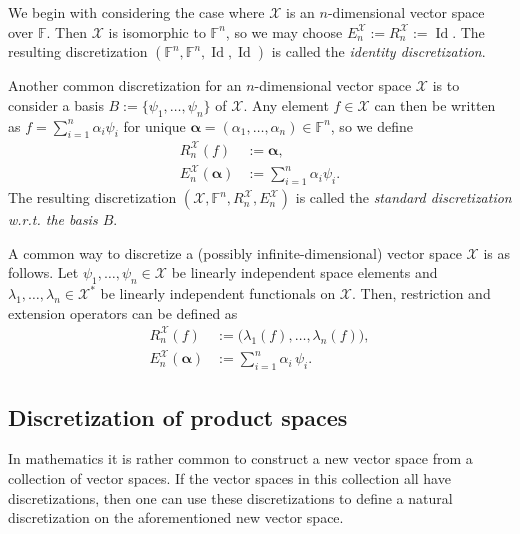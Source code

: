 \documentclass[a4paper]{paper}
\makeatletter
\newcommand{\VecSpace}[1]{\mathscr{#1}}
\newcommand{\Field}{\mathbb{F}}
\newcommand*{\EXT}[2]{\ensuremath{E_{#1}^{#2}}}
\newcommand*{\REST}[2]{\ensuremath{R_{#1}^{#2}}}
\newcommand*{\RnX}{\ensuremath{\REST{n}{\VecSpace{X}}}}
\newcommand*{\EnX}{\ensuremath{\EXT{n}{\VecSpace{X}}}}
\DeclareMathOperator{\Id}{Id}
\newcommand{\wrt}{{w.r.t.}\@\xspace}
\newcommand{\valpha}{\boldsymbol{\alpha}}
\makeatother
\begin{document}
\begin{examp}
 We begin with considering the case where $\VecSpace{X}$ is an $n$-dimensional vector space over $\Field$. Then $\VecSpace{X}$ is 
 isomorphic to $\Field^{n}$, so we may choose $\EnX:=\RnX:=\Id$. The resulting discretization $( \Field^n, \Field^n, \Id, \Id )$ is called 
 the \emph{identity discretization}. 
\end{examp}

\begin{examp}
 Another common discretization for an $n$-dimensional vector space $\VecSpace{X}$ is to consider a basis $B:=\{ \psi_1,\ldots, \psi_{n}\}$ 
 of $\VecSpace{X}$. Any element $f \in \VecSpace{X}$ can then be written as $f = \sum_{i=1}^n \alpha_i \psi_i$ for unique 
 $\valpha = (\alpha_1, \ldots, \alpha_{n})\in\Field^n$,
 so we define
 \begin{align*}
  \RnX(f) &:= \valpha, \\
  \EnX(\valpha) &:= \sum_{i=1}^n \alpha_i \psi_i. 
 \end{align*}
 The resulting discretization $( \VecSpace{X}, \Field^{n}, \RnX, \EnX )$ is called the \emph{standard discretization \wrt the basis $B$}.
\end{examp}

\begin{examp}
 A common way to discretize a (possibly infinite-dimensional) vector space $\VecSpace{X}$ is as follows. Let 
 $\psi_1, \ldots, \psi_n \in \VecSpace{X}$ be linearly independent space elements and $\lambda_1, \ldots, \lambda_n \in \VecSpace{X}^*$ be 
 linearly independent functionals on $\VecSpace{X}$. Then, restriction and extension operators can be defined as
 \begin{align*}
  \RnX(f) &:= \big( \lambda_1(f), \ldots, \lambda_n(f) \big), \\
  \EnX(\valpha) &:= \sum_{i=1}^n \alpha_i\, \psi_i.
 \end{align*}
\end{examp}


\subsection{Discretization of product spaces}
\label{subsec:product_space_discretization}

In mathematics it is rather common to construct a new vector space from a collection of vector spaces. If the vector spaces in this 
collection all have discretizations, then one can use these discretizations to define a natural discretization on the aforementioned new 
vector space.
\end{document}
